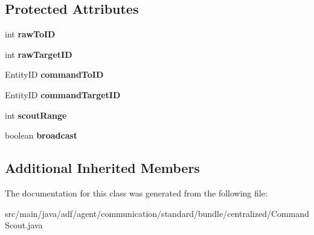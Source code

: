 \subsection*{Protected Attributes}
\begin{DoxyCompactItemize}
\item 
\hypertarget{classadf_1_1agent_1_1communication_1_1standard_1_1bundle_1_1centralized_1_1CommandScout_a1f60975ba8efdff7cd14d27b15f5df79}{}\label{classadf_1_1agent_1_1communication_1_1standard_1_1bundle_1_1centralized_1_1CommandScout_a1f60975ba8efdff7cd14d27b15f5df79} 
int {\bfseries raw\+To\+ID}
\item 
\hypertarget{classadf_1_1agent_1_1communication_1_1standard_1_1bundle_1_1centralized_1_1CommandScout_a83a07a8511379eab334bb2acf99c19f2}{}\label{classadf_1_1agent_1_1communication_1_1standard_1_1bundle_1_1centralized_1_1CommandScout_a83a07a8511379eab334bb2acf99c19f2} 
int {\bfseries raw\+Target\+ID}
\item 
\hypertarget{classadf_1_1agent_1_1communication_1_1standard_1_1bundle_1_1centralized_1_1CommandScout_a02ec990c0adfac132a48a2b0b637b1ca}{}\label{classadf_1_1agent_1_1communication_1_1standard_1_1bundle_1_1centralized_1_1CommandScout_a02ec990c0adfac132a48a2b0b637b1ca} 
Entity\+ID {\bfseries command\+To\+ID}
\item 
\hypertarget{classadf_1_1agent_1_1communication_1_1standard_1_1bundle_1_1centralized_1_1CommandScout_ac064c242a5757c9e4063391192ca1f0e}{}\label{classadf_1_1agent_1_1communication_1_1standard_1_1bundle_1_1centralized_1_1CommandScout_ac064c242a5757c9e4063391192ca1f0e} 
Entity\+ID {\bfseries command\+Target\+ID}
\item 
\hypertarget{classadf_1_1agent_1_1communication_1_1standard_1_1bundle_1_1centralized_1_1CommandScout_a9378ee2673497c99bda86473501ea9b1}{}\label{classadf_1_1agent_1_1communication_1_1standard_1_1bundle_1_1centralized_1_1CommandScout_a9378ee2673497c99bda86473501ea9b1} 
int {\bfseries scout\+Range}
\item 
\hypertarget{classadf_1_1agent_1_1communication_1_1standard_1_1bundle_1_1centralized_1_1CommandScout_a5b36747655353d8ac8db0c6d81893baf}{}\label{classadf_1_1agent_1_1communication_1_1standard_1_1bundle_1_1centralized_1_1CommandScout_a5b36747655353d8ac8db0c6d81893baf} 
boolean {\bfseries broadcast}
\end{DoxyCompactItemize}
\subsection*{Additional Inherited Members}


The documentation for this class was generated from the following file\+:\begin{DoxyCompactItemize}
\item 
src/main/java/adf/agent/communication/standard/bundle/centralized/Command\+Scout.\+java\end{DoxyCompactItemize}

